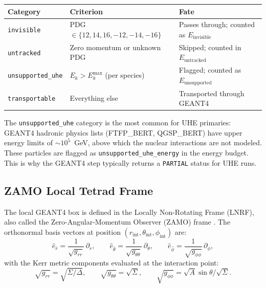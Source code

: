 \documentclass[11pt,a4paper]{article}
\begin{document}
\begin{center}
\begin{tabular}{lll}
\toprule
Category & Criterion & Fate \\
\midrule
\texttt{invisible} & PDG $\in \{12, 14, 16, -12, -14, -16\}$ & Passes through; counted as $E_\mathrm{invisible}$ \\
\texttt{untracked} & Zero momentum or unknown PDG & Skipped; counted in $E_\mathrm{untracked}$ \\
\texttt{unsupported\_uhe} & $E_k > E_k^\mathrm{max}$ (per species) & Flagged; counted as $E_\mathrm{unsupported}$ \\
\texttt{transportable} & Everything else & Transported through GEANT4 \\
\bottomrule
\end{tabular}
\end{center}

The \texttt{unsupported\_uhe} category is the most common for UHE primaries: GEANT4 hadronic physics lists (FTFP\_BERT, QGSP\_BERT) have upper energy limits of $\sim10^5$~GeV, above which the nuclear interactions are not modeled. These particles are flagged as \texttt{unsupported\_uhe\_energy} in the energy budget. This is why the GEANT4 step typically returns a \texttt{PARTIAL} status for UHE runs.

\subsection{ZAMO Local Tetrad Frame}

The local GEANT4 box is defined in the Locally Non-Rotating Frame (LNRF), also called the Zero-Angular-Momentum Observer (ZAMO) frame \cite{Bardeen1972}. The orthonormal basis vectors at position $(r_\mathrm{int}, \theta_\mathrm{int}, \phi_\mathrm{int})$ are:
\begin{equation}
  \hat{e}_{\hat{r}} = \frac{1}{\sqrt{g_{rr}}}\,\partial_r, \qquad
  \hat{e}_{\hat{\theta}} = \frac{1}{\sqrt{g_{\theta\theta}}}\,\partial_\theta, \qquad
  \hat{e}_{\hat{\phi}} = \frac{1}{\sqrt{g_{\phi\phi}}}\,\partial_\phi,
  \label{eq:tetrad}
\end{equation}
with the Kerr metric components evaluated at the interaction point:
\begin{equation}
  \sqrt{g_{rr}} = \sqrt{\Sigma/\Delta}, \qquad
  \sqrt{g_{\theta\theta}} = \sqrt{\Sigma}, \qquad
  \sqrt{g_{\phi\phi}} = \sqrt{A}\sin\theta/\sqrt{\Sigma}.
\end{equation}
\end{document}
